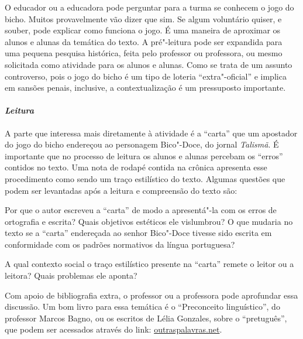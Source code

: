 \documentclass[11pt]{extarticle}
\begin{document}
O educador ou a educadora pode perguntar para a turma se conhecem o
jogo do bicho. Muitos provavelmente vão dizer que sim. Se algum
voluntário quiser, e souber, pode explicar como funciona o jogo. É uma
maneira de aproximar os alunos e alunas da temática do texto. A
pré"-leitura pode ser expandida para uma pequena pesquisa histórica,
feita pelo professor ou professora, ou mesmo solicitada como atividade
para os alunos e alunas. Como se trata de um assunto controverso, pois o
jogo do bicho é um tipo de loteria ``extra"-oficial'' e implica em
sansões penais, inclusive, a contextualização é um pressuposto
importante.

\paragraph{\textit{Leitura}}

A parte que interessa mais diretamente à atividade é a ``carta'' que um
apostador do jogo do bicho endereçou ao personagem Bico"-Doce, do jornal
\emph{Talismã}. É importante que no processo de leitura os alunos e
alunas percebam os ``erros'' contidos no texto. Uma nota de rodapé
contida na crônica apresenta esse procedimento como sendo um traço
estilístico do texto. Algumas questões que podem ser levantadas após a
leitura e compreensão do texto são:

Por que o autor escreveu a ``carta'' de modo a apresentá"-la com os
erros de ortografia e escrita? Quais objetivos estéticos ele vislumbrou?
O que mudaria no texto se a ``carta'' endereçada ao senhor Bico"-Doce
tivesse sido escrita em conformidade com os padrões normativos da língua
portuguesa?

A qual contexto social o traço estilístico presente na ``carta''
remete o leitor ou a leitora? Quais problemas ele aponta?

Com apoio de bibliografia extra, o professor ou a professora pode
aprofundar essa discussão. Um bom livro para essa temática é o
``Preconceito linguístico'', do professor Marcos Bagno, ou os escritos
de Lélia Gonzales, sobre o ``pretuguês'', que podem ser acessados
através do link:
\href{https://outraspalavras.net/eurocentrismoemxeque/para"-compreender"-a"-amefrica"-e"-o"-pretugues/}{outraspalavras.net}.
\end{document}
